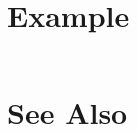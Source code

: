 

\section{Example} %
\label{sec:rbaLinearConv_example}
\begin{lstlisting}

\end{lstlisting}

\section{See Also} %
\label{sec:rbaLinearConv_see_also}
\texttt{}




